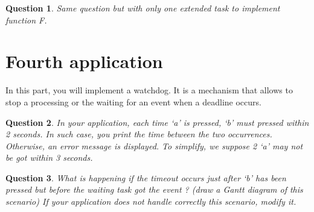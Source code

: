 \documentclass[11pt]{article}
\newtheorem{ex}{Question}
\begin{document}
\begin{ex}
Same question but with only one extended task to implement function F.
\end{ex}

\section{Fourth application}

In this part, you will implement a watchdog. It is a mechanism that allows to stop a processing or the waiting for an event when a deadline occurs.

\begin{ex}
In your application, each time `a' is pressed, `b' must pressed within 2 seconds. In such case, you print the time between the two occurrences. Otherwise, an error message is displayed. To simplify, we suppose 2 `a' may not be got within 3 seconds.
\end{ex}

\begin{ex}
What is happening if the timeout occurs just after `b' has been pressed but before the waiting task got the event ? (draw a Gantt diagram of this scenario) If your application does not handle correctly this scenario, modify it.
\end{ex}
\end{document}
